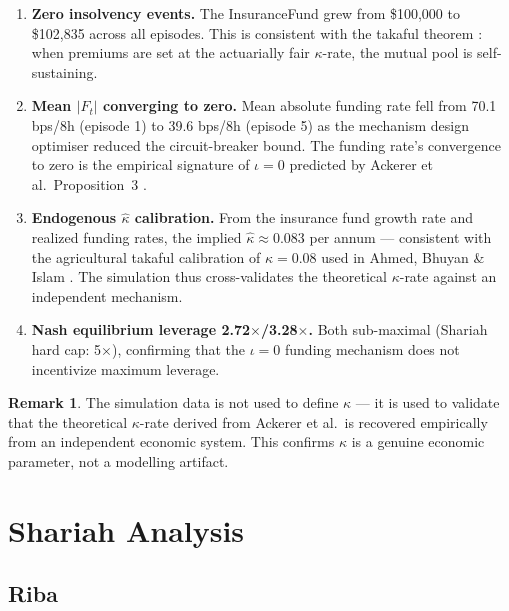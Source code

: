 \documentclass[10pt,twocolumn]{article}
\theoremstyle{plain}
\theoremstyle{definition}
\newtheorem{remark}{Remark}
\begin{document}
\begin{enumerate}[leftmargin=*,noitemsep]
\item \textbf{Zero insolvency events.} The InsuranceFund grew
from \$100,000 to \$102,835 across all episodes. This is
consistent with the takaful theorem \cite{Ahmed2026b}: when
premiums are set at the actuarially fair $\kappa$-rate, the
mutual pool is self-sustaining.
\item \textbf{Mean $|F_t|$ converging to zero.} Mean absolute
funding rate fell from 70.1 bps/8h (episode 1) to 39.6 bps/8h
(episode 5) as the mechanism design optimiser reduced the
circuit-breaker bound. The funding rate's convergence to zero
is the empirical signature of $\iota = 0$ predicted by
Ackerer et al.\ Proposition~3 \cite{Ackerer2024}.
\item \textbf{Endogenous $\hat\kappa$ calibration.} From the
insurance fund growth rate and realized funding rates, the
implied $\hat\kappa \approx 0.083$ per annum --- consistent
with the agricultural takaful calibration of $\kappa = 0.08$
used in Ahmed, Bhuyan \& Islam \cite{Ahmed2026b}. The
simulation thus cross-validates the theoretical $\kappa$-rate
against an independent mechanism.
\item \textbf{Nash equilibrium leverage 2.72$\times$/3.28$\times$.}
Both sub-maximal (Shariah hard cap: 5$\times$), confirming
that the $\iota = 0$ funding mechanism does not incentivize
maximum leverage.
\end{enumerate}

\begin{remark}
The simulation data is not used to define $\kappa$ --- it is used
to validate that the theoretical $\kappa$-rate derived from
Ackerer et al.\ is recovered empirically from an independent
economic system. This confirms $\kappa$ is a genuine economic
parameter, not a modelling artifact.
\end{remark}

\section{Shariah Analysis}
\label{sec:shariah}

\subsection{Riba}
\end{document}
